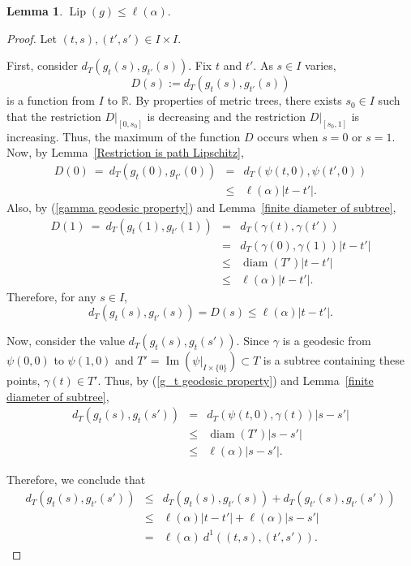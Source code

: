 \documentclass{article}
\newtheorem{lemma}[theorem]{Lemma}
\theoremstyle{definition}
\theoremstyle{remark}
\def\deq{:=}
\def\R{\mathbb{R}}
\DeclareMathOperator{\Ima}{Im}
\newcommand{\length}[1]{\ell}%
\DeclareMathOperator{\Lip}{Lip}
\DeclareMathOperator{\diam}{diam}
\begin{document}
\begin{lemma}\label{Lipschitz constant of the geodesic homotopy}
$\Lip(g)\leq\length{M}(\alpha).$
\end{lemma}

\begin{proof}
Let $(t,s), (t',s')\in I\times I$. 

First, consider $d_T(g_t(s), g_{t'}(s))$. Fix $t$ and $t'$. As $s\in I$ varies, 
\[
D(s)\deq d_T(g_t(s), g_{t'}(s))
\] 
is a function from $I$ to $\R$. By properties of metric trees, there exists $s_0\in I$ such that the restriction $D|_{[0,s_0]}$ is decreasing and the restriction $D|_{[s_0,1]}$ is increasing. %
Thus, the maximum of the function $D$ occurs when $s=0$ or $s=1$. Now, by Lemma~\ref{Restriction is path Lipschitz},
\begin{eqnarray*}
D(0) ~ = ~ d_T(g_t(0), g_{t'}(0)) & = & d_T(\psi(t,0), \psi(t',0)) \\
						      & \leq & \length{M}(\alpha)\left|t-t'\right|. 
\end{eqnarray*}
Also, by (\ref{gamma geodesic property}) and Lemma~\ref{finite diameter of subtree},
\begin{eqnarray*}
D(1) ~ = ~ d_T(g_t(1), g_{t'}(1)) & = & d_T(\gamma(t), \gamma(t')) \\
							      & = & d_T(\gamma(0), \gamma(1))\left|t-t'\right| \\
							      & \leq & \diam(T')\left|t-t'\right| \\
							      & \leq & \length{M}(\alpha)\left|t-t'\right|.
\end{eqnarray*}
Therefore, for any $s\in I$,
\[
d_T(g_t(s), g_{t'}(s)) = D(s) \leq \length{M}(\alpha)\left|t-t'\right|.
\]

Now, consider the value $d_T(g_t(s), g_{t}(s'))$. Since $\gamma$ is a geodesic from $\psi(0,0)$ to $\psi(1,0)$ and $T'=\Ima(\psi|_{I\times\{0\}})\subset T$ is a subtree containing these points, $\gamma(t)\in T'$. Thus, by (\ref{g_t geodesic property}) and Lemma~\ref{finite diameter of subtree},
\begin{eqnarray*}
d_T(g_t(s), g_t(s')) & = & d_T(\psi(t,0), \gamma(t))\left|s-s'\right| \\
				    & \leq & \diam(T')\left|s-s'\right| \\
				    & \leq & \length{M}(\alpha)\left|s-s'\right|.
\end{eqnarray*}

Therefore, we conclude that
\begin{eqnarray*}
d_T(g_t(s), g_{t'}(s')) & \leq & d_T(g_t(s), g_{t'}(s)) + d_T(g_{t'}(s), g_{t'}(s')) \\
					& \leq & \length{M}(\alpha)\left|t-t'\right| + \length{M}(\alpha)\left|s-s'\right| \\
					& = & \length{M}(\alpha)~d^1((t,s), (t',s')).
\end{eqnarray*}

\end{proof}
\end{document}
